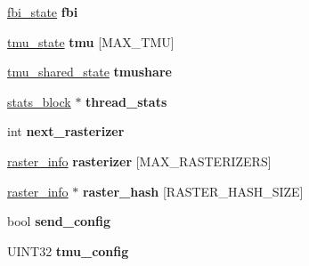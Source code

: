 \begin{DoxyCompactItemize}
\item 
\hypertarget{struct__voodoo__state_a9d94f4ddd141199bcf68d54dfec7b612}{\hyperlink{struct__fbi__state}{fbi\-\_\-state} {\bfseries fbi}}\label{struct__voodoo__state_a9d94f4ddd141199bcf68d54dfec7b612}

\item 
\hypertarget{struct__voodoo__state_a89cb4b022d083053f2c48b95c9ee871a}{\hyperlink{struct__tmu__state}{tmu\-\_\-state} {\bfseries tmu} \mbox{[}M\-A\-X\-\_\-\-T\-M\-U\mbox{]}}\label{struct__voodoo__state_a89cb4b022d083053f2c48b95c9ee871a}

\item 
\hypertarget{struct__voodoo__state_af04cfddcd46121b54f710e22b575c2d5}{\hyperlink{struct__tmu__shared__state}{tmu\-\_\-shared\-\_\-state} {\bfseries tmushare}}\label{struct__voodoo__state_af04cfddcd46121b54f710e22b575c2d5}

\item 
\hypertarget{struct__voodoo__state_a7b8873ac07cb3b74c7f7a5c1154bffa2}{\hyperlink{struct__stats__block}{stats\-\_\-block} $\ast$ {\bfseries thread\-\_\-stats}}\label{struct__voodoo__state_a7b8873ac07cb3b74c7f7a5c1154bffa2}

\item 
\hypertarget{struct__voodoo__state_a650ed616295323d7ba313d887c04d0f1}{int {\bfseries next\-\_\-rasterizer}}\label{struct__voodoo__state_a650ed616295323d7ba313d887c04d0f1}

\item 
\hypertarget{struct__voodoo__state_ad29d317d76341b5ccd3cad07dbdfe294}{\hyperlink{struct__raster__info}{raster\-\_\-info} {\bfseries rasterizer} \mbox{[}M\-A\-X\-\_\-\-R\-A\-S\-T\-E\-R\-I\-Z\-E\-R\-S\mbox{]}}\label{struct__voodoo__state_ad29d317d76341b5ccd3cad07dbdfe294}

\item 
\hypertarget{struct__voodoo__state_a28e0422c3399f33fda74a9b020fe1227}{\hyperlink{struct__raster__info}{raster\-\_\-info} $\ast$ {\bfseries raster\-\_\-hash} \mbox{[}R\-A\-S\-T\-E\-R\-\_\-\-H\-A\-S\-H\-\_\-\-S\-I\-Z\-E\mbox{]}}\label{struct__voodoo__state_a28e0422c3399f33fda74a9b020fe1227}

\item 
\hypertarget{struct__voodoo__state_a7f0bd4ed2292b0dde15c05795fc842ea}{bool {\bfseries send\-\_\-config}}\label{struct__voodoo__state_a7f0bd4ed2292b0dde15c05795fc842ea}

\item 
\hypertarget{struct__voodoo__state_abd42743829b26e495b699ca8d6cac044}{U\-I\-N\-T32 {\bfseries tmu\-\_\-config}}\label{struct__voodoo__state_abd42743829b26e495b699ca8d6cac044}


\end{DoxyCompactItemize}
